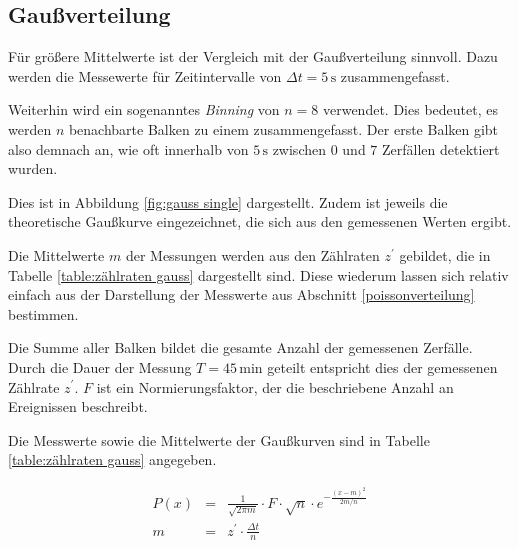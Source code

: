 \documentclass[12pt,a4paper]{scrartcl}
\numberwithin{equation}{section} %
\begin{document}
\hypertarget{gauuxdfverteilung}{%
\subsection{Gaußverteilung}\label{gauuxdfverteilung}}
Für größere Mittelwerte ist der Vergleich mit der Gaußverteilung sinnvoll. Dazu werden die Messewerte für Zeitintervalle von $\Delta t = 5 \mathrm{\,s}$ zusammengefasst.

Weiterhin wird ein sogenanntes \textit{Binning} von $n = 8$ verwendet. Dies bedeutet, es werden $n$ benachbarte Balken zu einem zusammengefasst. Der erste Balken gibt also demnach an, wie oft innerhalb von $5 \mathrm{\, s}$ zwischen $0$ und $7$ Zerfällen detektiert wurden.

Dies ist in Abbildung \ref{fig:gauss single} dargestellt. Zudem ist jeweils die theoretische Gaußkurve eingezeichnet, die sich aus den gemessenen Werten ergibt.

Die Mittelwerte $m$ der Messungen werden aus den Zählraten $z^\prime$ gebildet, die in Tabelle \ref{table:zählraten gauss} dargestellt sind. Diese wiederum lassen sich relativ einfach aus der Darstellung der Messwerte aus Abschnitt \ref{poissonverteilung} bestimmen.

Die Summe aller Balken bildet die gesamte Anzahl der gemessenen Zerfälle. Durch die Dauer der Messung $T=45 \mathrm{\, min}$ geteilt entspricht dies der gemessenen Zählrate $z^\prime$. $F$ ist ein Normierungsfaktor, der die beschriebene Anzahl an Ereignissen beschreibt.

Die Messwerte sowie die Mittelwerte der Gaußkurven sind in Tabelle \ref{table:zählraten gauss} angegeben.

\begin{eqnarray}
	P(x) &=& \frac{1}{\sqrt{2 \pi m}} \cdot F \cdot \sqrt{n} \cdot e^{- \frac{(x-m)^2}{2m/n}} \\
	m &=& z^\prime \cdot \frac{\Delta t}{n}
\end{eqnarray}
\end{document}
